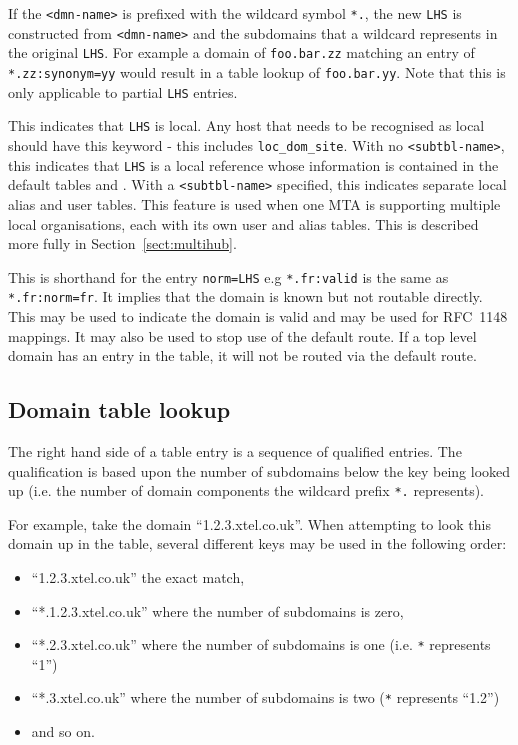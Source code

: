 \begin{describe}
If the \verb+<dmn-name>+ is prefixed with the wildcard symbol
\verb+*.+, the new \verb|LHS| is constructed from \verb+<dmn-name>+
and the subdomains that a wildcard represents in the original
\verb+LHS+. For example a domain of \verb|foo.bar.zz| matching an
entry of \verb|*.zz:synonym=yy| would result in a table lookup of
\verb|foo.bar.yy|. 
Note that this is only applicable to partial \verb+LHS+ entries.

\item[\protect{\verb+local=<subtbl-name>+}:]
This indicates that \verb|LHS| is local. Any host that needs to be
recognised as local should have this keyword - this includes
{\verb|loc_dom_site|}. With no {\verb|<subtbl-name>|}, this indicates
that \verb|LHS| is a local reference whose information is contained in
the default tables  and . With a
\verb|<subtbl-name>| specified, this indicates separate local alias
and user tables.  This feature is used when one MTA is supporting
multiple local organisations, each with its own user and alias tables.
This is described more fully in Section~\ref{sect:multihub}.

\item[\verb+valid+:]
This is shorthand for the entry \verb+norm=LHS+
e.g \verb+*.fr:valid+ is the
same as \verb+*.fr:norm=fr+.
It implies that the domain is known but not routable directly. This
may be used to indicate the domain is valid and may be used for
RFC~1148 mappings. It may also be used to stop use of the default
route. If a top level domain has an entry in the  table,
it will not be routed via the default route.
\end{describe}


\subsection*{Domain table lookup}

The right hand side of a  table entry is a sequence of
qualified entries.
The qualification is based upon the number of subdomains below the key
being looked up (i.e. the number of domain components the wildcard
prefix \verb+*.+ represents).

For example, take the domain ``1.2.3.xtel.co.uk''.
When attempting to look this domain up in the table, several different
keys may be used in the following order:
\begin{itemize}
\item ``1.2.3.xtel.co.uk'' the exact match,
\item ``*.1.2.3.xtel.co.uk'' where the number of subdomains is zero,
\item ``*.2.3.xtel.co.uk'' where the number of subdomains is one (i.e.
\verb|*| represents ``1'')
\item ``*.3.xtel.co.uk'' where the number of subdomains is two (\verb|*|
represents ``1.2'') 
\item and so on.
\end{itemize}

